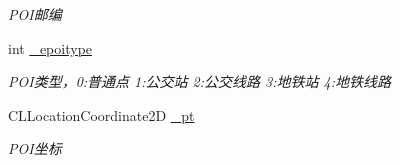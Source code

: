 \begin{DoxyCompactItemize}
\begin{DoxyCompactList}\small\item\em P\+O\+I邮编 \end{DoxyCompactList}\item 
\hypertarget{interface_b_m_k_poi_info_a5c00c72364b946887e29f42208cfa944}{int \hyperlink{interface_b_m_k_poi_info_a5c00c72364b946887e29f42208cfa944}{\+\_\+epoitype}}\label{interface_b_m_k_poi_info_a5c00c72364b946887e29f42208cfa944}

\begin{DoxyCompactList}\small\item\em P\+O\+I类型，0\+:普通点 1\+:公交站 2\+:公交线路 3\+:地铁站 4\+:地铁线路 \end{DoxyCompactList}\item 
\hypertarget{interface_b_m_k_poi_info_afe07d662e1b6c47a64cfa2bd8a70780b}{C\+L\+Location\+Coordinate2\+D \hyperlink{interface_b_m_k_poi_info_afe07d662e1b6c47a64cfa2bd8a70780b}{\+\_\+pt}}\label{interface_b_m_k_poi_info_afe07d662e1b6c47a64cfa2bd8a70780b}

\begin{DoxyCompactList}\small\item\em P\+O\+I坐标 \end{DoxyCompactList}\end{DoxyCompactItemize}

